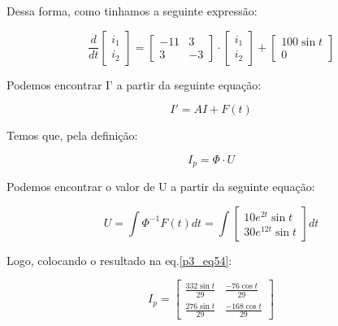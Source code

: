 \documentclass[12pt]{article}%
\begin{document}
    Dessa forma, como tinhamos a seguinte expressão:
    
    \[
    \frac{d}{dt}
    \begin{bmatrix}
        i_{1}     \\
        i_{2}      
    \end{bmatrix}
    = 
    \begin{bmatrix}
       -11  &  3      \\
       3  &  -3     
    \end{bmatrix} 
    \cdot
    \begin{bmatrix}
        i_{1}     \\
        i_{2}      
    \end{bmatrix}
    +
    \begin{bmatrix}
        100\sin{t}     \\
        0      
    \end{bmatrix}
    \]
    
    Podemos encontrar I' a partir da seguinte equação:
    
    \begin{equation}
        I' = AI + F(t)
    \end{equation}
    
    Temos que, pela definição:
    
    \begin{equation}
        I_{p} = \Phi \cdot U
        \label{p3_eq54}
    \end{equation}
    
    Podemos encontrar o valor de U a partir da seguinte equação:
    
    \begin{equation}
        U = \int \Phi^{-1} F(t) dt
        = 
        \int 
        \begin{bmatrix}
            10e^{2t}\sin{t} \\
            30e^{12t}\sin{t}
        \end{bmatrix}
        dt
    \end{equation}
    
    Logo, colocando o resultado na eq.\ref{p3_eq54}:
    
    \begin{equation}
        I_{p} = 
        \begin{bmatrix}
            \frac{332\sin{t}}{29} & \frac{-76\cos{t}}{29} \\
            \frac{276\sin{t}}{29} & \frac{-168\cos{t}}{29}
        \end{bmatrix}
    \end{equation}
    
\end{document}
